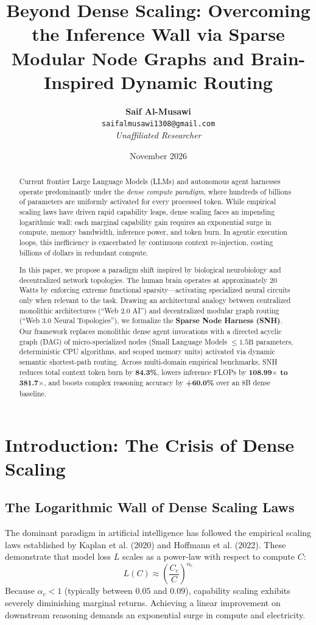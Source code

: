 \documentclass[11pt,a4paper]{article}
\title{\textbf{Beyond Dense Scaling: Overcoming the Inference Wall via Sparse Modular Node Graphs and Brain-Inspired Dynamic Routing}}
\author{\textbf{Saif Al-Musawi} \\ \texttt{saifalmusawi1308@gmail.com} \\ \textit{Unaffiliated Researcher}}
\date{November 2026}
\begin{document}
\maketitle

\begin{abstract}
Current frontier Large Language Models (LLMs) and autonomous agent harnesses operate predominantly under the \textit{dense compute paradigm}, where hundreds of billions of parameters are uniformly activated for every processed token. While empirical scaling laws have driven rapid capability leaps, dense scaling faces an impending logarithmic wall: each marginal capability gain requires an exponential surge in compute, memory bandwidth, inference power, and token burn. In agentic execution loops, this inefficiency is exacerbated by continuous context re-injection, costing billions of dollars in redundant compute. 

In this paper, we propose a paradigm shift inspired by biological neurobiology and decentralized network topologies. The human brain operates at approximately 20 Watts by enforcing extreme functional sparsity---activating specialized neural circuits only when relevant to the task. Drawing an architectural analogy between centralized monolithic architectures (``Web 2.0 AI'') and decentralized modular graph routing (``Web 3.0 Neural Topologies''), we formalize the \textbf{Sparse Node Harness (SNH)}. Our framework replaces monolithic dense agent invocations with a directed acyclic graph (DAG) of micro-specialized nodes (Small Language Models $\le 1.5\text{B}$ parameters, deterministic CPU algorithms, and scoped memory units) activated via dynamic semantic shortest-path routing. Across multi-domain empirical benchmarks, SNH reduces total context token burn by \textbf{84.3\%}, lowers inference FLOPs by \textbf{108.99$\times$ to 381.7$\times$}, and boosts complex reasoning accuracy by \textbf{+60.0\%} over an 8B dense baseline.
\end{abstract}

\section{Introduction: The Crisis of Dense Scaling}

\subsection{The Logarithmic Wall of Dense Scaling Laws}
The dominant paradigm in artificial intelligence has followed the empirical scaling laws established by Kaplan et al. (2020) and Hoffmann et al. (2022). These demonstrate that model loss $L$ scales as a power-law with respect to compute $C$:
\begin{equation}
L(C) \approx \left(\frac{C_c}{C}\right)^{\alpha_c}
\end{equation}
Because $\alpha_c < 1$ (typically between $0.05$ and $0.09$), capability scaling exhibits severely diminishing marginal returns. Achieving a linear improvement on downstream reasoning demands an exponential surge in compute and electricity.
\end{document}
